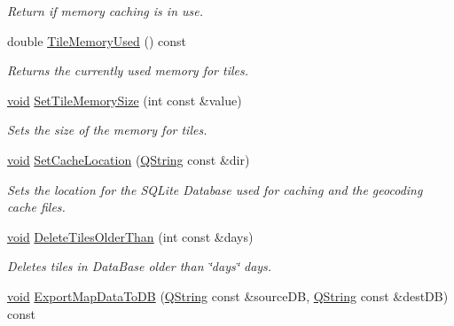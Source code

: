 \begin{DoxyCompactItemize}
\begin{DoxyCompactList}\small\item\em \-Return if memory caching is in use. \end{DoxyCompactList}\item 
double \hyperlink{group___o_p_map_widget_gaf1e79ea822cc04fd7bc6f9b566c19224}{\-Tile\-Memory\-Used} () const 
\begin{DoxyCompactList}\small\item\em \-Returns the currently used memory for tiles. \end{DoxyCompactList}\item 
\hyperlink{group___u_a_v_objects_plugin_ga444cf2ff3f0ecbe028adce838d373f5c}{void} \hyperlink{group___o_p_map_widget_gaa6bfe2092080fa7a3464cece122819b5}{\-Set\-Tile\-Memory\-Size} (int const \&value)
\begin{DoxyCompactList}\small\item\em \-Sets the size of the memory for tiles. \end{DoxyCompactList}\item 
\hyperlink{group___u_a_v_objects_plugin_ga444cf2ff3f0ecbe028adce838d373f5c}{void} \hyperlink{group___o_p_map_widget_ga735443d74919b6c74f91fbf1f0576931}{\-Set\-Cache\-Location} (\hyperlink{group___u_a_v_objects_plugin_gab9d252f49c333c94a72f97ce3105a32d}{\-Q\-String} const \&dir)
\begin{DoxyCompactList}\small\item\em \-Sets the location for the \-S\-Q\-Lite \-Database used for caching and the geocoding cache files. \end{DoxyCompactList}\item 
\hyperlink{group___u_a_v_objects_plugin_ga444cf2ff3f0ecbe028adce838d373f5c}{void} \hyperlink{group___o_p_map_widget_ga66137fefcd998b31354b7c0c4575b40a}{\-Delete\-Tiles\-Older\-Than} (int const \&days)
\begin{DoxyCompactList}\small\item\em \-Deletes tiles in \-Data\-Base older than \char`\"{}days\char`\"{} days. \end{DoxyCompactList}\item 
\hyperlink{group___u_a_v_objects_plugin_ga444cf2ff3f0ecbe028adce838d373f5c}{void} \hyperlink{group___o_p_map_widget_ga373e3935f7b6ce79ca89a7bbfdff8a00}{\-Export\-Map\-Data\-To\-D\-B} (\hyperlink{group___u_a_v_objects_plugin_gab9d252f49c333c94a72f97ce3105a32d}{\-Q\-String} const \&source\-D\-B, \hyperlink{group___u_a_v_objects_plugin_gab9d252f49c333c94a72f97ce3105a32d}{\-Q\-String} const \&dest\-D\-B) const 

\end{DoxyCompactItemize}
